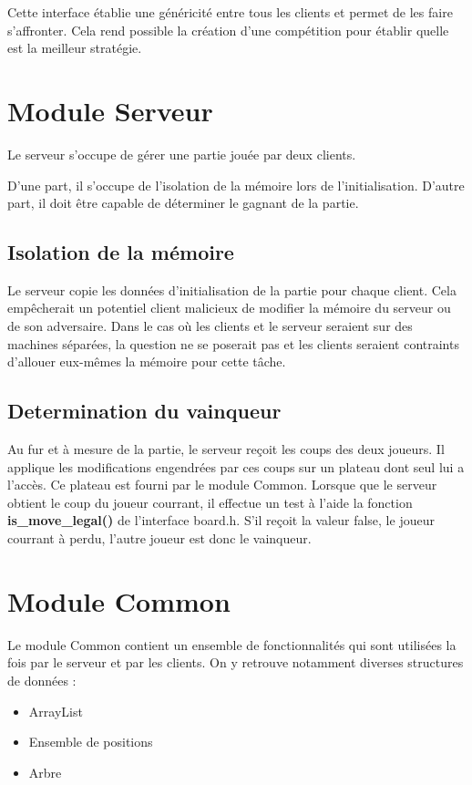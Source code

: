 \documentclass{article}
\begin{document}
Cette interface \'etablie une g\'en\'ericit\'e entre tous les clients et permet de les faire s'affronter.
Cela rend possible la cr\'eation d'une comp\'etition pour \'etablir quelle est 
la meilleur strat\'egie.

\section{Module Serveur}

Le serveur s'occupe de g\'erer une partie jou\'ee par deux clients. 

D'une part, il s'occupe de l'isolation de la m\'emoire lors de l'initialisation.
D'autre part, il doit \^etre capable de d\'eterminer le gagnant de la partie.


\subsection{Isolation de la m\'emoire}
Le serveur copie les donn\'ees d'initialisation de la partie pour chaque client.
Cela emp\^echerait un potentiel client malicieux de modifier la m\'emoire du serveur ou 
de son adversaire.
Dans le cas o\`u les clients et le serveur seraient sur des machines s\'epar\'ees, 
la question ne se poserait pas et les clients seraient contraints
d'allouer eux-m\^emes la m\'emoire pour cette t\^ache.

\subsection{Determination du vainqueur}
Au fur et \`a mesure de la partie, le serveur re\c coit les coups des deux joueurs.
Il applique les modifications engendr\'ees par ces coups sur un plateau dont seul lui a l'acc\`es.
Ce plateau est fourni par le module Common. Lorsque que le serveur obtient le coup 
du joueur courrant, il effectue un test \`a l'aide la fonction \textbf{is\_move\_legal()} de l'interface board.h.
S'il re\c coit la valeur false, le joueur courrant \`a perdu, l'autre joueur est donc le vainqueur.


\section{Module Common}
Le module Common contient un ensemble de fonctionnalit\'es qui sont 
utilis\'ees la fois par le serveur et par les clients. On y retrouve 
notamment diverses structures de donn\'ees :
\begin{itemize}
    \item ArrayList
    \item Ensemble de positions
    \item Arbre
\end{itemize}
\end{document}
